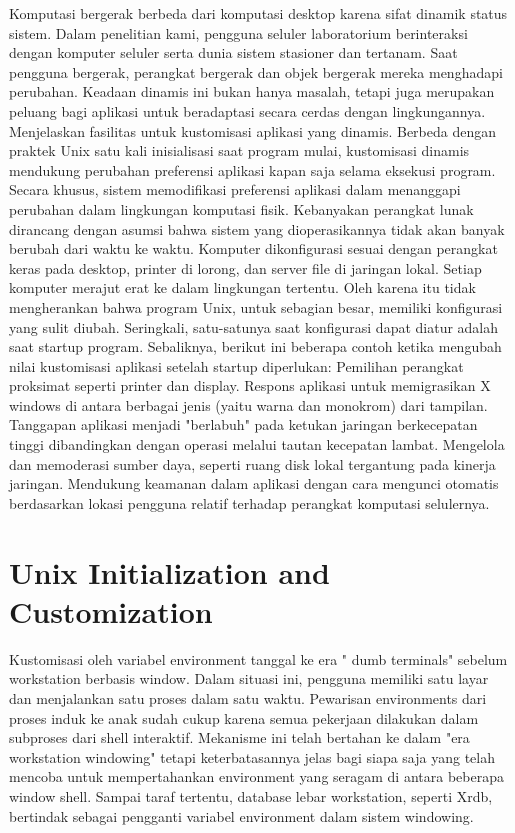 Komputasi bergerak berbeda dari komputasi desktop karena sifat dinamik status sistem. Dalam penelitian kami, pengguna seluler laboratorium berinteraksi dengan komputer seluler serta dunia sistem stasioner dan tertanam. Saat pengguna bergerak, perangkat bergerak dan objek bergerak mereka menghadapi perubahan. Keadaan dinamis ini bukan hanya masalah, tetapi juga merupakan peluang bagi aplikasi untuk beradaptasi secara cerdas dengan lingkungannya.
Menjelaskan fasilitas untuk kustomisasi aplikasi yang dinamis. Berbeda dengan praktek Unix satu kali inisialisasi saat program mulai, kustomisasi dinamis mendukung perubahan preferensi aplikasi kapan saja selama eksekusi program. Secara khusus, sistem memodifikasi preferensi aplikasi dalam menanggapi perubahan dalam lingkungan komputasi fisik.
Kebanyakan perangkat lunak dirancang dengan asumsi bahwa sistem yang dioperasikannya tidak akan banyak berubah dari waktu ke waktu. Komputer dikonfigurasi sesuai dengan perangkat keras pada desktop, printer di lorong, dan server file di jaringan lokal. Setiap komputer merajut erat ke dalam lingkungan tertentu. Oleh karena itu tidak mengherankan bahwa program Unix, untuk sebagian besar, memiliki konfigurasi yang sulit diubah. Seringkali, satu-satunya saat konfigurasi dapat diatur adalah saat startup program.
Sebaliknya, berikut ini beberapa contoh ketika mengubah nilai kustomisasi aplikasi setelah startup diperlukan:
Pemilihan perangkat proksimat seperti printer dan display.
Respons aplikasi untuk memigrasikan X windows di antara berbagai jenis (yaitu warna dan monokrom) dari tampilan.
Tanggapan aplikasi menjadi "berlabuh" pada ketukan jaringan berkecepatan tinggi dibandingkan dengan operasi melalui tautan kecepatan lambat.
Mengelola dan memoderasi sumber daya, seperti ruang disk lokal tergantung pada kinerja jaringan.
Mendukung keamanan dalam aplikasi dengan cara mengunci otomatis berdasarkan lokasi pengguna relatif terhadap perangkat komputasi selulernya.



\section {Unix Initialization and Customization}

Kustomisasi oleh variabel environment tanggal ke era " dumb terminals" sebelum workstation berbasis window. Dalam situasi ini, pengguna memiliki satu layar dan menjalankan satu proses dalam satu waktu. Pewarisan environments dari proses induk ke anak sudah cukup karena semua pekerjaan dilakukan dalam subproses dari shell interaktif. Mekanisme ini telah bertahan ke dalam "era workstation windowing" tetapi keterbatasannya jelas bagi siapa saja yang telah mencoba untuk mempertahankan environment yang seragam di antara beberapa window shell. Sampai taraf tertentu, database lebar workstation, seperti Xrdb, bertindak sebagai pengganti variabel environment dalam sistem windowing. \cite{schilit1993customizing}


